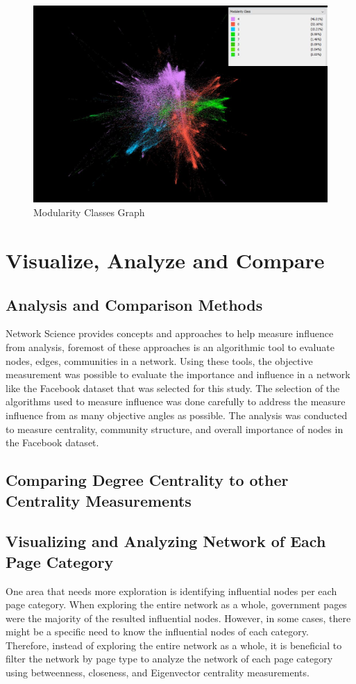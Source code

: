 \documentclass[11pt,twocolumn]{article}
\begin{document}
\begin{figure}[hbt!]
\includegraphics[scale=0.28]{modularity_community.JPG} 
\caption{Modularity Classes Graph}
\end{figure}



\section{Visualize, Analyze and Compare}

\subsection{Analysis and Comparison Methods}
Network Science provides concepts and approaches to help measure influence from analysis, foremost of these approaches is an algorithmic tool to evaluate nodes, edges, communities in a network. Using these tools, the objective measurement was possible to evaluate the importance and influence in a network like the Facebook dataset that was selected for this study. The selection of the algorithms used to measure influence was done carefully to address the measure influence from as many objective angles as possible. The analysis was conducted to measure centrality, community structure, and overall importance of nodes in the Facebook dataset.

\subsection{Comparing Degree Centrality to other Centrality Measurements}

\subsection{Visualizing and Analyzing Network of Each Page Category}
One area that needs more exploration is identifying influential nodes per each page category. When exploring the entire network as a whole, government pages were the majority of the resulted influential nodes. However, in some cases, there might be a specific need to know the influential nodes of each category. Therefore, instead of exploring the entire network as a whole, it is beneficial to filter the network by page type to analyze the network of each page category using betweenness, closeness, and Eigenvector centrality measurements. 
\end{document}
